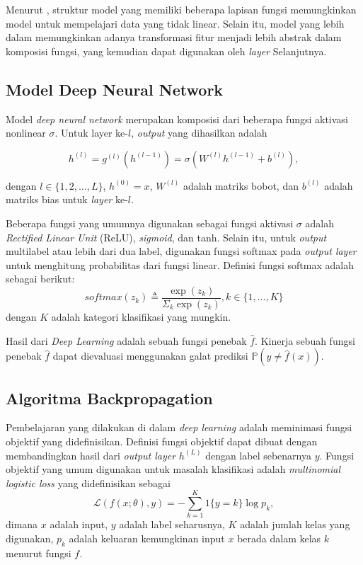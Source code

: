 Menurut \textcite{Bengio2021}, struktur model yang memiliki beberapa lapisan fungsi memungkinkan model untuk mempelajari data yang tidak linear. Selain itu, model yang lebih dalam memungkinkan adanya transformasi fitur menjadi lebih abstrak dalam komposisi fungsi, yang kemudian dapat digunakan oleh \emph{layer} Selanjutnya.

\subsection{Model Deep Neural Network}
Model \emph{deep neural network} merupakan komposisi dari beberapa fungsi aktivasi nonlinear $\sigma$. Untuk layer ke-$l$, \emph{output} yang dihasilkan adalah

\begin{equation}
  h^{(l)} = g^{(l)}(h^{(l-1)}) = \sigma(W^{(l)}h^{(l-1)} + b^{(l)}),
\end{equation}

dengan $l \in \{1,2,\dots,L\}$, $h^{(0)} = x$, $W^{(l)}$ adalah matriks bobot, dan $b^{(l)}$ adalah matriks bias untuk \emph{layer} ke-$l$.

Beberapa fungsi yang umumnya digunakan sebagai fungsi aktivasi $\sigma$ adalah \emph{Rectified Linear Unit} (ReLU), \emph{sigmoid}, dan tanh. Selain itu, untuk \emph{output} multilabel atau lebih dari dua label, digunakan fungsi softmax pada \emph{output layer} untuk menghitung probabilitas dari fungsi linear. Definisi fungsi softmax adalah sebagai berikut:
\begin{equation}
  softmax(z_k) \triangleq \frac{\exp(z_k)}{\Sigma_k \exp(z_k)},
  k \in \{1,\dots,K\}
\end{equation}
dengan $K$ adalah kategori klasifikasi yang mungkin.

Hasil dari \emph{Deep Learning} adalah sebuah fungsi penebak $\hat{f}$. Kinerja sebuah fungsi penebak $\hat{f}$ dapat dievaluasi menggunakan galat prediksi $\mathbb{P}(y \neq \hat{f}(x))$.

\subsection{Algoritma Backpropagation}
Pembelajaran yang dilakukan di dalam \emph{deep learning} adalah meminimasi fungsi objektif yang didefinisikan. Definisi fungsi objektif dapat dibuat dengan membandingkan hasil dari \emph{output layer} $h^{(L)}$ dengan label sebenarnya $y$. Fungsi objektif yang umum digunakan untuk masalah klasifikasi adalah \emph{multinomial logistic loss} yang didefinisikan sebagai
\begin{equation}
  \mathcal{L}(f(x;\theta),y) = -\sum_{k=1}^K 1\{y=k\} \log p_k,
\end{equation}
dimana $x$ adalah input, $y$ adalah label seharusnya, $K$ adalah jumlah kelas yang digunakan, $p_k$ adalah keluaran kemungkinan input $x$ berada dalam kelas $k$ menurut fungsi $f$.

